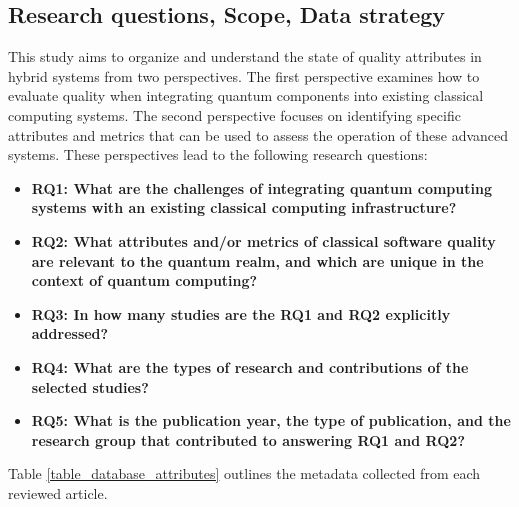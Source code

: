 \subsection{Research questions, Scope, Data strategy}

This study aims to organize and understand the state of quality attributes in hybrid systems from two perspectives. The first perspective examines how to evaluate quality when integrating quantum components into existing classical computing systems. The second perspective focuses on identifying specific attributes and metrics that can be used to assess the operation of these advanced systems. These perspectives lead to the following research questions:

\begin{itemize}
    \item \textbf{RQ1: What are the challenges of integrating quantum computing systems with an existing classical computing infrastructure? }
    \item \textbf{RQ2: What attributes and/or metrics of classical software quality are relevant to the quantum realm, and which are unique in the context of quantum computing?}
    \item \textbf{RQ3: In how many studies are the RQ1 and RQ2 explicitly addressed?}
    \item \textbf{RQ4: What are the types of research and contributions of the selected studies?}
    \item \textbf{RQ5: What is the publication year, the type of publication, and the research group that contributed to answering RQ1 and RQ2?}
\end{itemize}

Table \ref{table_database_attributes} outlines the metadata collected from each reviewed article.%

